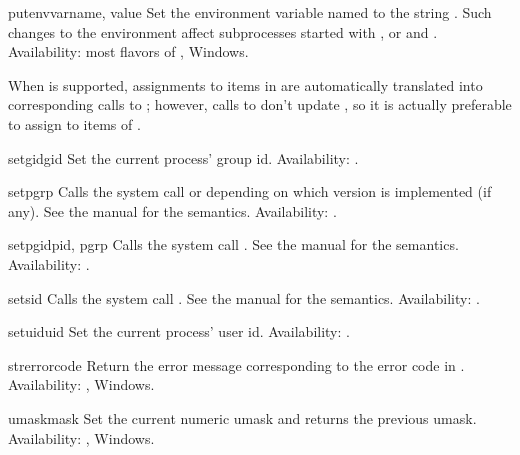 \begin{funcdesc}{putenv}{varname, value}
Set the environment variable named  to the string
.  Such changes to the environment affect subprocesses
started with ,  or
 and .
Availability: most flavors of \UNIX{}, Windows.

When  is
supported, assignments to items in  are automatically
translated into corresponding calls to ; however,
calls to  don't update , so it is
actually preferable to assign to items of .  
\end{funcdesc}

\begin{funcdesc}{setgid}{gid}
Set the current process' group id.
Availability: \UNIX{}.
\end{funcdesc}

\begin{funcdesc}{setpgrp}{}
Calls the system call  or  depending on which version is implemented (if any).  See the
\UNIX{} manual for the semantics.
Availability: \UNIX{}.
\end{funcdesc}

\begin{funcdesc}{setpgid}{pid, pgrp}
Calls the system call .  See the \UNIX{} manual
for the semantics.
Availability: \UNIX{}.
\end{funcdesc}

\begin{funcdesc}{setsid}{}
Calls the system call .  See the \UNIX{} manual
for the semantics.
Availability: \UNIX{}.
\end{funcdesc}

\begin{funcdesc}{setuid}{uid}
Set the current process' user id.
Availability: \UNIX{}.
\end{funcdesc}

\begin{funcdesc}{strerror}{code}
Return the error message corresponding to the error code in
.
Availability: \UNIX{}, Windows.
\end{funcdesc}

\begin{funcdesc}{umask}{mask}
Set the current numeric umask and returns the previous umask.
Availability: \UNIX{}, Windows.
\end{funcdesc}


